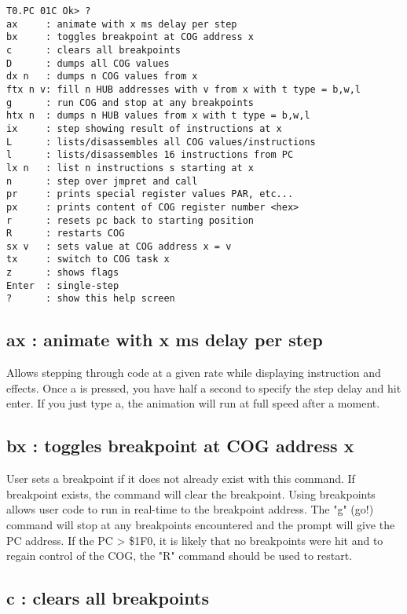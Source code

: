 \documentclass{article}
\numberwithin{equation}{section} %
\begin{document}
\begin{lstlisting}
T0.PC 01C Ok> ?
ax     : animate with x ms delay per step
bx     : toggles breakpoint at COG address x
c      : clears all breakpoints
D      : dumps all COG values
dx n   : dumps n COG values from x
ftx n v: fill n HUB addresses with v from x with t type = b,w,l
g      : run COG and stop at any breakpoints
htx n  : dumps n HUB values from x with t type = b,w,l
ix     : step showing result of instructions at x
L      : lists/disassembles all COG values/instructions
l      : lists/disassembles 16 instructions from PC
lx n   : list n instructions s starting at x
n      : step over jmpret and call
pr     : prints special register values PAR, etc...
px     : prints content of COG register number <hex>
r      : resets pc back to starting position
R      : restarts COG
sx v   : sets value at COG address x = v
tx     : switch to COG task x
z      : shows flags
Enter  : single-step
?      : show this help screen
\end{lstlisting}


\subsection{ax     : animate with x ms delay per step}

Allows stepping through code at a given rate while displaying instruction and effects.
Once a is pressed, you have half a second to specify the step delay and hit enter.
If you just type a, the animation will run at full speed after a moment.

\subsection{bx     : toggles breakpoint at COG address x}

User sets a breakpoint if it does not already exist with this command.
If breakpoint exists, the command will clear the breakpoint.
Using breakpoints allows user code to run in real-time to the breakpoint address.
The "g" (go!) command will stop at any breakpoints encountered and the prompt
will give the PC address. If the PC > \$1F0, it is likely that no breakpoints
were hit and to regain control of the COG, the "R" command should be used to restart.


\subsection{c      : clears all breakpoints}
\end{document}
